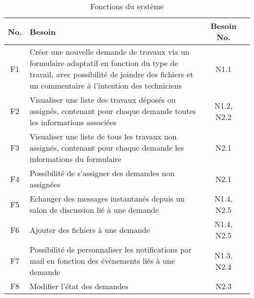 \documentclass[
    iai, %
    eai, %
]{heig-tb}
\begin{document}
\begin{table}[h]
  \begin{center}
    \caption{Fonctions du système \label{specification}}
    \begin{tabularx}{\textwidth}{cXcc}
      No. & Besoin                                                                                                                                                                                     & Besoin No. \\ \toprule
      F1  & Créer une nouvelle demande de travaux via un formulaire adaptatif en fonction du type de travail, avec possibilité de joindre des fichiers et un commentaire à l’intention des techniciens & N1.1       \\ \midrule
      F2  & Visualiser une liste des travaux déposés ou assignés, contenant pour chaque demande toutes les informations associées                                                                      & N1.2, N2.2 \\ \midrule
      F3  & Visualiser une liste de tous les travaux non assignés, contenant pour chaque demande les informations du formulaire                                                                        & N2.1       \\ \midrule
      F4  & Possibilité de s’assigner des demandes non assignées                                                                                                                                       & N2.1       \\ \midrule
      F5  & Echanger des messages instantanés depuis un salon de discussion lié à une demande                                                                                                          & N1.4, N2.5 \\ \midrule
      F6  & Ajouter des fichiers à une demande                                                                                                                                                         & N1.4, N2.5 \\ \midrule
      F7  & Possibilité de personnaliser les notifications par mail en fonction des évènements liés à une demande                                                                                      & N1.3, N2.4 \\ \midrule
      F8  & Modifier l’état des demandes                                                                                                                                                               & N2.3       \\ \midrule

\end{tabularx}
\end{center}
\end{table}
\end{document}
